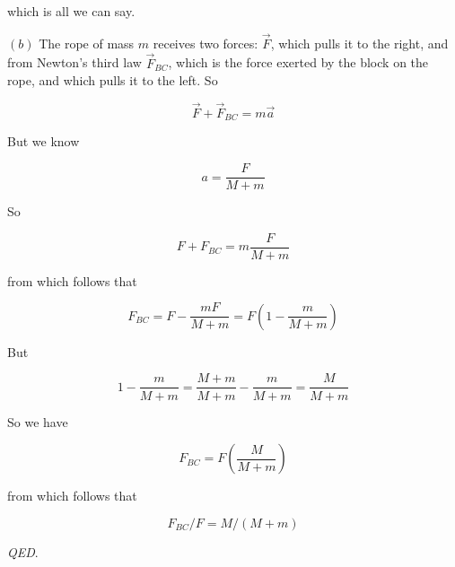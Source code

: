 \documentclass[12pt]{article}
\theoremstyle{definition}
\begin{document}
which is all we can say.

$(b)$ The rope of mass $m$ receives two forces: $\vec{F}$, which pulls it to the
right, and from Newton's third law $\vec{F}_{BC}$, which is the force exerted by 
the block on the rope, and which pulls it to the left. So 

\begin{equation}
    \vec{F} + \vec{F}_{BC} = m \vec{a}
\end{equation}

But we know

\begin{equation}
    a = \frac{F}{M + m}
\end{equation}

So 

\begin{equation}
    F + F_{BC} = m \frac{F}{M + m}
\end{equation}

from which follows that 

\begin{equation}
    F_{BC} = F - \frac{mF}{M + m}  = F\left(1 - \frac{m}{M + m} \right)
\end{equation}

But 

\begin{equation}
    1 - \frac{m}{M + m}  = \frac{M+m}{M + m} - \frac{m}{M + m}  = \frac{M}{M + m}
\end{equation}

So we have 

\begin{equation}
    F_{BC} = F\left( \frac{M}{M+m} \right) 
\end{equation}

from which follows that 

\begin{equation}
    F_{BC}/F = M / (M+m)
\end{equation}

\textit{QED}.
\end{document}
